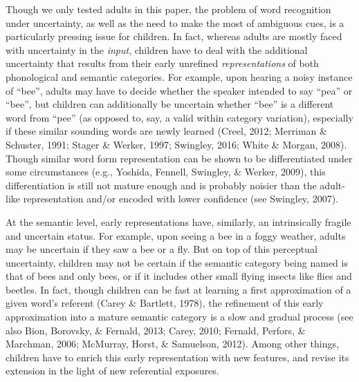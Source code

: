 \documentclass[english,floatsintext,man]{apa6}
\theoremstyle{definition}
\theoremstyle{definition}
\theoremstyle{definition}
\theoremstyle{remark}
\begin{document}
Though we only tested adults in this paper, the problem of word
recognition under uncertainty, as well as the need to make the most of
ambiguous cues, is a particularly pressing issue for children. In fact,
whereas adults are mostly faced with uncertainty in the \emph{input},
children have to deal with the additional uncertainty that results from
their early unrefined \emph{representations} of both phonological and
semantic categories. For example, upon hearing a noisy instance of
\enquote{bee}, adults may have to decide whether the speaker intended to
say \enquote{pea} or \enquote{bee}, but children can additionally be
uncertain whether \enquote{bee} is a different word from \enquote{pee}
(as opposed to, say, a valid within category variation), especially if
these similar sounding words are newly learned (Creel, 2012; Merriman \&
Schuster, 1991; Stager \& Werker, 1997; Swingley, 2016; White \& Morgan,
2008). Though similar word form representation can be shown to be
differentiated under some circumstances (e.g., Yoshida, Fennell,
Swingley, \& Werker, 2009), this differentiation is still not mature
enough and is probably noisier than the adult-like representation and/or
encoded with lower confidence (see Swingley, 2007).

At the semantic level, early representations have, similarly, an
intrinsically fragile and uncertain status. For example, upon seeing a
bee in a foggy weather, adults may be uncertain if they saw a bee or a
fly. But on top of this perceptual uncertainty, children may not be
certain if the semantic category being named is that of bees and only
bees, or if it includes other small flying insects like flies and
beetles. In fact, though children can be fast at learning a first
approximation of a given word's referent (Carey \& Bartlett, 1978), the
refinement of this early approximation into a mature semantic category
is a slow and gradual process (see also Bion, Borovsky, \& Fernald,
2013; Carey, 2010; Fernald, Perfors, \& Marchman, 2006; McMurray, Horst,
\& Samuelson, 2012). Among other things, children have to enrich this
early representation with new features, and revise its extension in the
light of new referential exposures.
\end{document}

